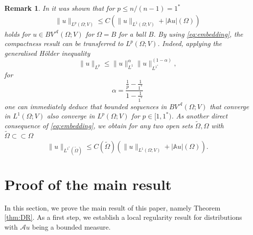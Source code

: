 \documentclass[11pt,reqno]{amsart}
\theoremstyle{plain}
\newtheorem{remark}[theorem]{Remark}
\theoremstyle{definition}
\theoremstyle{remark}
\numberwithin{equation}{section}
\newcommand{\A}{\mathcal{A}}
\renewcommand{\AA}{\mathbb{A}}
\newcommand{\1}{\mathbbm{1}} %
\begin{document}
\begin{remark}\label{remark:poincare_embedding}
    In \cite[Theorem 1.1]{GR19_0} it was shown that for $p \leq n/(n-1) = 1^*$
    \begin{align}\label{eq:embedding}
        \|u\|_{L^p(\Omega; V)} \leq C (\|u\|_{L^1(\Omega; V)} + |\AA u|(\Omega))
    \end{align}
    holds for $u \in BV^\A(\Omega; V)$ for $\Omega = B$ for a ball $B$. By using \eqref{eq:embedding}, the compactness result can be transferred to $L^p(\Omega; V)$. Indeed, applying the generalised Hölder inequality 
    \[
        \|u\|_{L^p} \leq \|u\|_{L^1}^\alpha\|u\|_{L^{1^*}}^{(1-\alpha)},
    \]
    for 
    \[
        \alpha = \frac{\frac{1}{p} - \frac{1}{1^*}}{1 - \frac{1}{1^*}}
    \]
    one can immediately deduce that bounded sequences in $BV^\A(\Omega;V)$ that converge in $L^1(\Omega; V)$ also converge in $L^p(\Omega; V)$ for $p \in [1, 1^*)$. As another direct consequence of \eqref{eq:embedding}, we obtain for any two open sets $\tilde \Omega, \Omega$ with $\tilde \Omega \subset \subset \Omega$
    \[
        \| u \|_{L^{1^*}(\tilde \Omega)} \leq C(\tilde \Omega) (\|u\|_{L^1(\Omega; V)} + |\AA u|(\Omega)).
    \]
\end{remark}


\section{Proof of the main result}
\label{sec:regularity}

In this section, we prove the main result of this paper, namely Theorem \ref{thm:DR}. As a first step, we establish a local regularity result for distributions with $\A u$ being a bounded measure.
\end{document}
